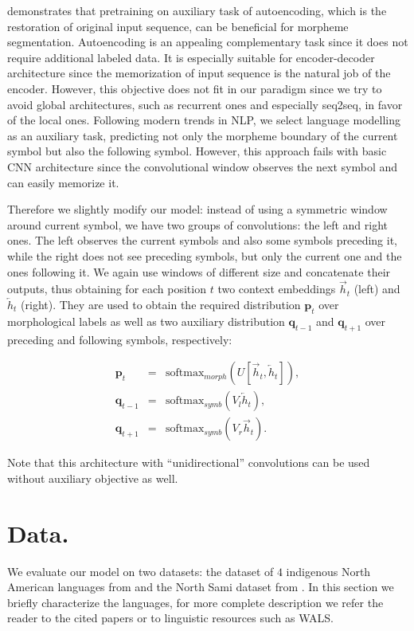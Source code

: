 \documentclass[11pt,a4paper]{article}
\begin{document}
 demonstrates that pretraining on auxiliary task of autoencoding, which is the restoration of original input sequence, can be beneficial for morpheme segmentation. Autoencoding is an appealing complementary task since it does not require additional labeled data. It is especially suitable for encoder-decoder architecture since the memorization of input sequence is the natural job of the encoder. However, this objective does not fit in our paradigm since we try to avoid global architectures, such as recurrent ones and especially seq2seq, in favor of the local ones. Following modern trends in NLP, we select language modelling as an auxiliary task, predicting not only the morpheme boundary of the current symbol but also the following symbol. However, this approach fails with basic CNN architecture since the convolutional window observes the next symbol and can easily memorize it.

Therefore we slightly modify our model: instead of using a symmetric window around current symbol, we have two groups of convolutions: the left and right ones. The left observes the current symbols and also some symbols preceding it, while the right does not see preceding symbols, but only the current one and the ones following it. We again use windows of different size and concatenate their outputs, thus obtaining for each position $t$ two context embeddings $\vec{h}_t$ (left) and $\overleftarrow{h}_t$ (right). They are used to obtain the required distribution $\mathbf{p}_t$ over morphological labels as well as two auxiliary distribution $\mathbf{q}_{t-1}$ and $\mathbf{q}_{t+1}$ over preceding and following symbols, respectively:

$$
\begin{array}{rcl}
	\mathbf{p}_t & = & \mathrm{softmax}_{morph}(U [\vec{h}_t, \overleftarrow{h}_t]), \\[4pt]
	\mathbf{q}_{t-1}  & = & \mathrm{softmax}_{symb}(V_l \overleftarrow{h}_t), \\[4pt]
	\mathbf{q}_{t+1}  & = & \mathrm{softmax}_{symb}(V_r \vec{h}_t).
\end{array}
$$

Note that this architecture with ``unidirectional'' convolutions can be used without auxiliary objective as well.

\section{Data.}

We evaluate our model on two datasets: the dataset of $4$ indigenous North American languages from  and the North Sami dataset from . In this section we briefly characterize the languages, for more complete description we refer the reader to the cited papers or to linguistic resources such as WALS.
\end{document}
